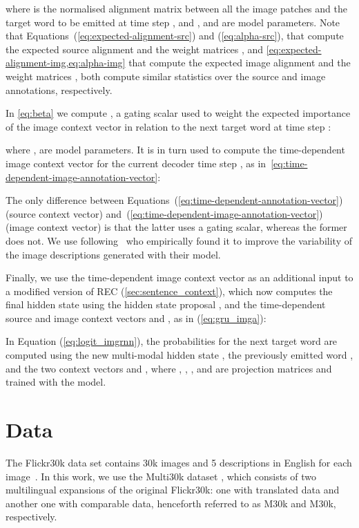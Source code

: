 \documentclass[11pt]{article}
\begin{document}
\noindent
where  is the normalised alignment matrix between all the image patches  and the target word to be emitted at time step , and ,  and  are model parameters.
Note that Equations~(\ref{eq:expected-alignment-src}) and (\ref{eq:alpha-src}), that compute the expected source alignment  and the weight matrices , and \cref{eq:expected-alignment-img,eq:alpha-img} that compute the expected image alignment  and the weight matrices , both compute similar statistics over the source and image annotations, respectively.


In \cref{eq:beta} we compute , a gating scalar used to weight the expected importance of the image context vector in relation to the next target word at time step :

\noindent
where ,  are model parameters.
It is in turn used to compute the time-dependent image context vector  for the current decoder time step , as in~\cref{eq:time-dependent-image-annotation-vector}:


The only difference between Equations~(\ref{eq:time-dependent-annotation-vector}) (source context vector) and~(\ref{eq:time-dependent-image-annotation-vector}) (image context vector) is that the latter uses a gating scalar, whereas the former does not.
We use  following~ who empirically found it to improve the variability of the image descriptions generated with their model.


Finally, we use the time-dependent image context vector  as an additional input to a modified version of REC (\cref{sec:sentence_context}), which now computes the final hidden state  using the hidden state proposal , and the time-dependent source and image context vectors  and , as in (\ref{eq:gru_imga}):

\begin{comment}

\end{comment}

In Equation (\ref{eq:logit_imgrnn}), the probabilities for the next target word are computed using the new multi-modal hidden state , the previously emitted word , and the two context vectors  and , where , , ,  and  are projection matrices and trained with the model.



\section{Data}
\label{sec:dataset}

The Flickr30k data set contains 30k images and 5 descriptions in English for each image~\cite{Youngetal2014}.
In this work, we use the Multi30k dataset \cite{ElliottFrankSimaanSpecia2016}, which consists of two multilingual expansions of the original Flickr30k: one with translated data and another one with comparable data, henceforth referred to as M30k and M30k, respectively.
\end{document}
